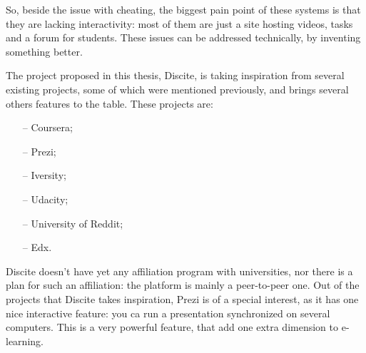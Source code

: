 So, beside the issue with cheating, the biggest pain point of these systems is that they are
lacking interactivity: most of them are just a site hosting videos, tasks and a forum for students.
These issues can be addressed technically, by inventing something better.

The project proposed in this thesis, Discite, is taking inspiration from several existing projects, some of which
were mentioned previously, and brings several others features to the table. These projects are:
\begin{enumerate}[topsep=5pt, partopsep=0pt,itemsep=3pt,parsep=1pt]
    \item[--] Coursera;
    \item[--] Prezi;
    \item[--] Iversity;
    \item[--] Udacity;
    \item[--] University of Reddit;
    \item[--] Edx.
\end{enumerate}
Discite doesn't have yet any affiliation program with universities, nor there is a plan
for such an affiliation: the platform is mainly a peer-to-peer one.
Out of the projects that Discite takes inspiration, Prezi is of a special interest, as it has one nice interactive feature: you ca run
a presentation synchronized on several computers. This is a very powerful feature,
that add one extra dimension to e-learning.
\clearpage
